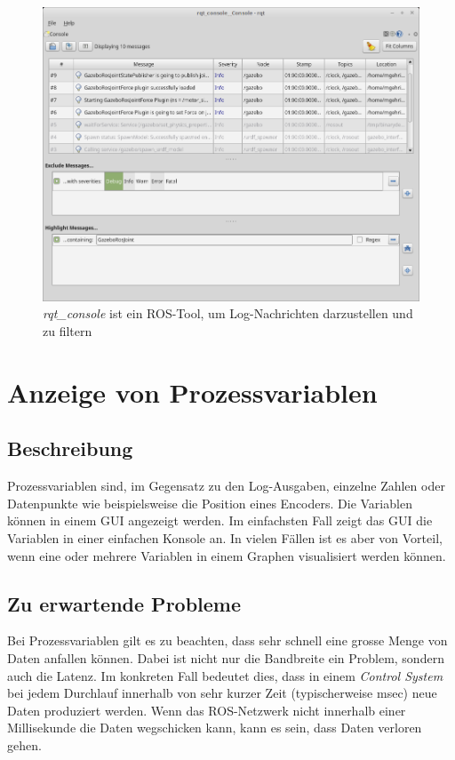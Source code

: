 \begin{figure}[!ht]
\centering
\includegraphics[angle=0,width=\textwidth]{images/screenshotRqtConsole.png}
\caption{\textit{rqt\_console} ist ein ROS-Tool, um Log-Nachrichten darzustellen und zu filtern}
\label{fig:rqtConsole}
\end{figure}


\section{Anzeige von Prozessvariablen}
\subsection{Beschreibung}
Prozessvariablen sind, im Gegensatz zu den Log-Ausgaben, einzelne Zahlen oder Datenpunkte wie beispielsweise die Position eines Encoders.
Die Variablen können in einem GUI angezeigt werden.
Im einfachsten Fall zeigt das GUI die Variablen in einer einfachen Konsole an.
In vielen Fällen ist es aber von Vorteil, wenn eine oder mehrere Variablen in einem Graphen visualisiert werden können.

\subsection{Zu erwartende Probleme}
Bei Prozessvariablen gilt es zu beachten, dass sehr schnell eine grosse Menge von Daten anfallen können.
Dabei ist nicht nur die Bandbreite ein Problem, sondern auch die Latenz.
Im konkreten Fall bedeutet dies, dass in einem \textit{Control System} bei jedem Durchlauf innerhalb von sehr kurzer Zeit (typischerweise \unit[1]{msec}) neue Daten produziert werden.
Wenn das ROS-Netzwerk nicht innerhalb einer Millisekunde die Daten wegschicken kann, kann es sein, dass Daten verloren gehen.

